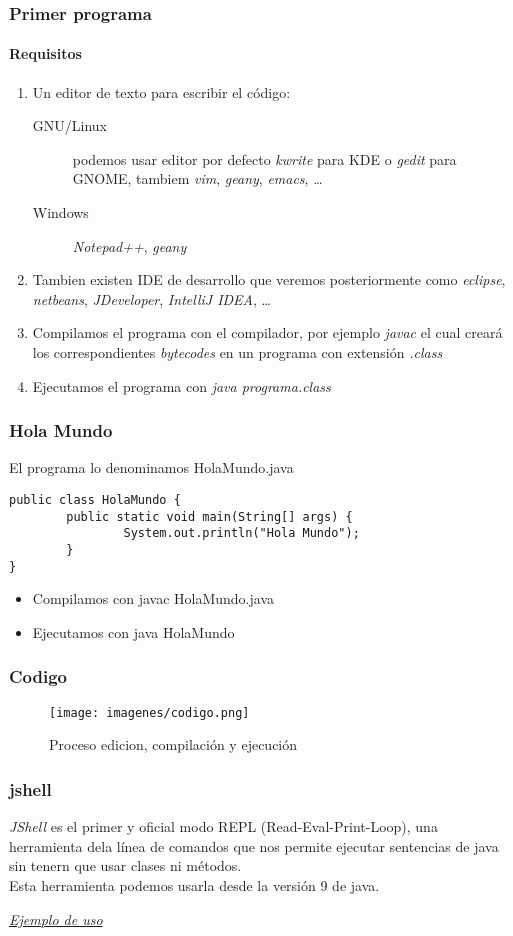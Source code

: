 \documentclass{beamer}
\begin{document}
\begin{frame}
\frametitle{Primer programa}
\framesubtitle{Requisitos}
\begin{enumerate}[<+->]
\item Un editor de texto para escribir el código:
\begin{description}
\item[GNU/Linux] podemos usar editor por defecto \emph{kwrite} para KDE o \emph{gedit} para GNOME, tambiem \emph{vim}, \emph{geany}, \emph{emacs}, \dots
\item[Windows] \emph{Notepad++}, \emph{geany}
\end{description}  
\item Tambien existen IDE de desarrollo que veremos posteriormente como \emph{eclipse}, \emph{netbeans}, \emph{JDeveloper}, \emph{IntelliJ IDEA},  \dots 
\item Compilamos el programa con el compilador, por ejemplo \emph{javac} el cual creará los correspondientes \emph{bytecodes} en un programa con extensión \emph{.class}
\item Ejecutamos el programa con \emph{java programa.class}
\end{enumerate}
\end{frame}



\begin{frame}[fragile]
\frametitle{Hola Mundo} 
El programa lo denominamos \alert{HolaMundo.java}
\begin{verbatim}
public class HolaMundo {
        public static void main(String[] args) {
                System.out.println("Hola Mundo");
        }
}
\end{verbatim} 
\pause
\begin{itemize}[<+->]
\item Compilamos con \alert{javac HolaMundo.java}
\item Ejecutamos con \alert{java HolaMundo}
\end{itemize}
\end{frame}

\begin{frame}
\frametitle{Codigo} 
\begin{figure}
\texttt{[image: imagenes/codigo.png]} 
\caption{Proceso edicion, compilación y ejecución}
\end{figure} 
\end{frame}

\begin{frame}
\frametitle{jshell} 
\emph{JShell} es el primer y oficial modo REPL (Read-Eval-Print-Loop), una herramienta dela línea de comandos que nos permite ejecutar sentencias de java sin tenern que usar clases ni métodos.\\
Esta herramienta podemos usarla desde la versión 9 de java.\\
\begin{center}
\href{https://aboullaite.me/jshell-java9/}{\emph{Ejemplo de uso}}

\end{center}
\end{frame}
\end{document}

